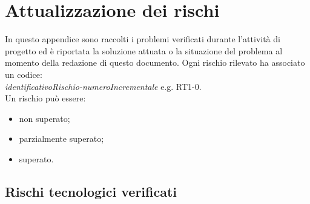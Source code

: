 \section{Attualizzazione dei rischi}
In questo appendice sono raccolti i problemi verificati durante l'attività di progetto ed è riportata la soluzione attuata o la situazione del problema al momento della redazione di questo documento.
Ogni rischio rilevato ha associato un codice: \\
\textit{identificativoRischio-numeroIncrementale} e.g. RT1-0. \\
\noindent Un rischio può essere:
\begin{itemize}
    \item non superato;
    \item parzialmente superato;
    \item superato.
\end{itemize}
\subsection{Rischi tecnologici verificati}
\def\problems{
    {   
        RT1-0,
        \noexpand\textbf{Prima rilevazione:} RP \noexpand\newline
        Alcuni membri del gruppo non conoscono o non sono pratici dello strumento Github.,
        Tali membri hanno dedicato allo strumento un breve periodo di autoformazione prima d'iniziare l'esperienza sul campo. I membri più esperti del team sono stati e resteranno sempre disponibili per chiarimenti.,
        \noexpand\textbf{Ultimo aggiornamento:} RQ \noexpand\newline
        Il rischio risulta superato.
    },
    {
        RT1-1,
        \noexpand\textbf{Prima rilevazione:} RA \noexpand\newline
        L'esperienza con LaTeX da parte del team (nella sua interezza) è poca o nulla.,
        La redazione dei documenti si è inizialmente rivelato un processo lento e frustrante{,} tuttavia è stato considerato un male necessario. Ancora adesso si riscontrano difficoltà rispetto alla creazione di tabelle e posizionamento di immagini.,
        \noexpand\textbf{Ultimo aggiornamento:} RQ \noexpand\newline
        Il rischio risulta superato.
    },
    {   
        RT1-2,
        \noexpand\textbf{Prima rilevazione:} RP \noexpand\newline
        Nessun membro del gruppo è pratico o ha conoscenze approfondite delle tecnologie coinvolte per la realizzazione del POC.,
        È stato dedicato un periodo di 2 settimane all'autoapprendimento delle tecnologie coinvolte{,} in particolare è stato deciso che ogni membro del gruppo deve avere per ognuna una conoscenza almeno superficiale.,
        \noexpand\textbf{Ultimo aggiornamento:} RQ \noexpand\newline
        Ogni membro del gruppo è specializzato in una particolare tecnologia{,} tuttavia queste non sono ancora completamente padroneggiate. Sebbene contenuto il rischio risulta parzialmente superato.
    },
}

